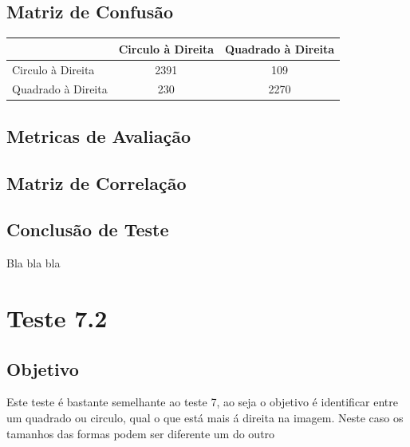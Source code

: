 \subsection{Matriz de Confusão}

\begin{table}[H]
\centering
\begin{tabular}{l|c c}
                & Circulo à Direita & Quadrado à Direita \\ 
\hline
Circulo à Direita         & 2391         & 109                  \\
Quadrado à Direita        & 230         & 2270                 \\

\end{tabular}
\end{table}

\subsection{Metricas de Avaliação}
\subsection{Matriz de Correlação}
\subsection{Conclusão de Teste}
    Bla bla bla

\newpage

\section{Teste 7.2}
\subsection{Objetivo}
    Este teste é bastante semelhante ao teste 7, ao seja o objetivo é identificar entre um quadrado ou circulo, qual o que está mais á direita na imagem. Neste caso os tamanhos das formas podem ser diferente um do outro
